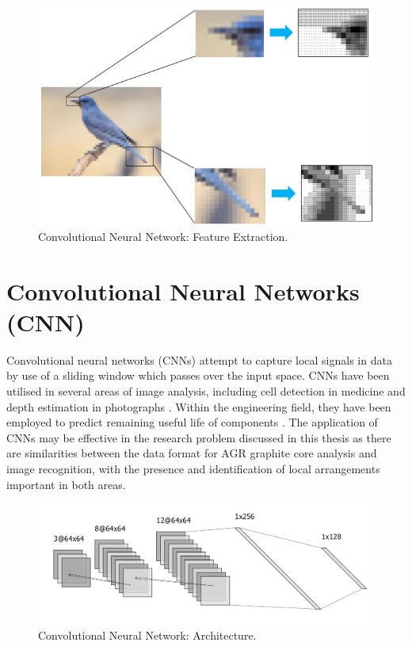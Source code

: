 \begin{figure}[p]
	\centering
	\includegraphics[scale=0.75]{Figures/cnn_feature.png}
	\caption{Convolutional Neural Network: Feature Extraction.}
	\label{fig:cnn_feature}
\end{figure}

\section{Convolutional Neural Networks (CNN)} \label{convolution}

Convolutional neural networks (CNNs) attempt to capture local signals in data by use of a sliding window which passes over the input space. CNNs have been utilised in several areas of image analysis, including cell detection in medicine \cite{xie2015beyond} and depth estimation in photographs \cite{li2015depth}. Within the engineering field, they have been employed to predict remaining useful life of components \cite{babu2016deep}. The application of CNNs may be effective in the research problem discussed in this thesis as there are similarities between the data format for AGR graphite core analysis and image recognition, with the presence and identification of local arrangements important in both areas.
\\

\begin{figure}[p]
	\centering
	\includegraphics[scale=0.45]{Figures/cnn_arch.png}
	\caption{Convolutional Neural Network: Architecture.}
	\label{fig:cnn}
\end{figure}

